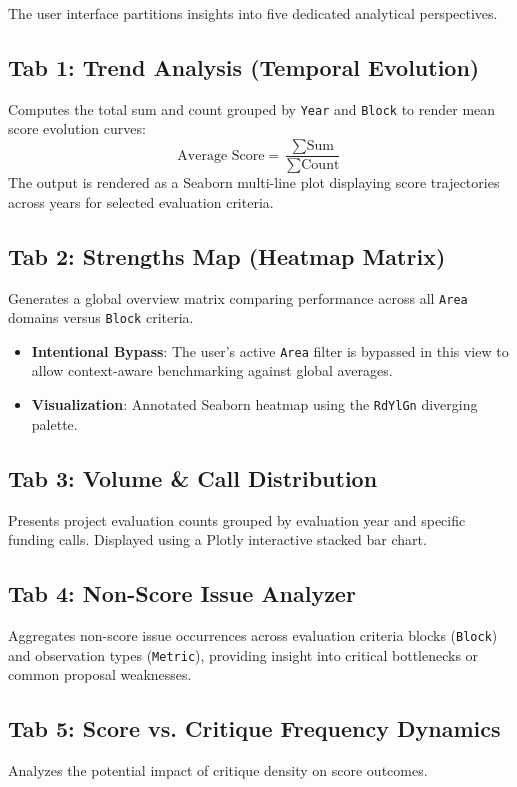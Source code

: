 \documentclass[11pt, a4paper]{article}
\begin{document}
The user interface partitions insights into five dedicated analytical perspectives.

\subsection{Tab 1: Trend Analysis (Temporal Evolution)}
Computes the total sum and count grouped by \texttt{Year} and \texttt{Block} to render mean score evolution curves:
\begin{equation}
\text{Average Score} = \frac{\sum \text{Sum}}{\sum \text{Count}}
\end{equation}
The output is rendered as a Seaborn multi-line plot displaying score trajectories across years for selected evaluation criteria.

\subsection{Tab 2: Strengths Map (Heatmap Matrix)}
Generates a global overview matrix comparing performance across all \texttt{Area} domains versus \texttt{Block} criteria.
\begin{itemize}
    \item \textbf{Intentional Bypass}: The user's active \texttt{Area} filter is bypassed in this view to allow context-aware benchmarking against global averages.
    \item \textbf{Visualization}: Annotated Seaborn heatmap using the \texttt{RdYlGn} diverging palette.
\end{itemize}

\subsection{Tab 3: Volume \& Call Distribution}
Presents project evaluation counts grouped by evaluation year and specific funding calls. Displayed using a Plotly interactive stacked bar chart.

\subsection{Tab 4: Non-Score Issue Analyzer}
Aggregates non-score issue occurrences across evaluation criteria blocks (\texttt{Block}) and observation types (\texttt{Metric}), providing insight into critical bottlenecks or common proposal weaknesses.

\subsection{Tab 5: Score vs. Critique Frequency Dynamics}
Analyzes the potential impact of critique density on score outcomes.
\end{document}
